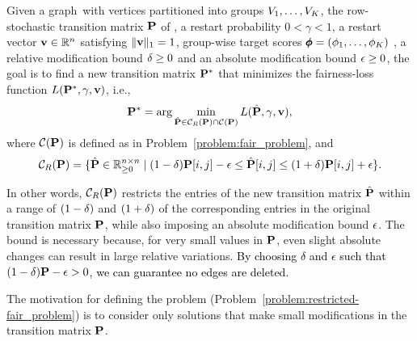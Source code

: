 \documentclass[sigconf, anonymous, review]{acmart}
\begin{document}
\begin{problem}[\resphiPageRank]
\label{problem:restricted-fair_problem}
Given a graph~\graph with vertices partitioned into groups $V_1, \ldots, V_K$, the row-stochastic transition matrix $\mathbf{{P}}$ of \graph, a restart probability $0 < \gamma < 1$, a restart vector $\mathbf{{v}} \in \mathbb{R}^{n}$ satisfying $\|\mathbf{{v}}\|_1 = 1$, group-wise target \pagerank scores $\pmb{\phi} = (\phi_1, \ldots, \phi_K)$ , a relative modification bound $\delta \ge 0$ and an absolute modification bound $\epsilon \ge 0$, the goal is to find a new transition matrix $\mathbf{{P}}^{*}$ that minimizes the fairness-loss function $L(\mathbf{{P}}^{*}, \gamma, \mathbf{{v}})$, i.e.,
\begin{equation}
\mathbf{{P}}^{*} = \arg \min_{\hat{\mathbf{{P}}} \in \mathcal{C}_R(\mathbf{{P}}) \cap \mathcal{C}(\mathbf{{P}})} L(\hat{\mathbf{{P}}}, \gamma, \mathbf{{v}}),
\label{eq:restrict_fair_problem}
\end{equation}
where $\mathcal{C}(\mathbf{{P}})$ is defined as in Problem~\ref{problem:fair_problem}, and
\begin{equation*}
    \mathcal{C}_R(\mathbf{{P}})
    =
    \{ \hat{\mathbf{{P}}} \in \mathbb{R}_{\geq 0}^{n \times n} \mid (1 - \delta) \mathbf{{P}}[i, j] - \epsilon \le \hat{\mathbf{{P}}}[i, j] \le (1 + \delta) \mathbf{{P}}[i, j] + \epsilon\}.
\end{equation*}
\end{problem}

In other words, $\mathcal{C}_R(\mathbf{{P}})$ restricts the entries of the new transition matrix $\hat{\mathbf{{P}}}$ within a range of $(1 - \delta)$ and $(1 + \delta)$ of the corresponding entries in the original transition matrix $\mathbf{{P}}$, while also imposing an absolute modification bound $\epsilon$. The  bound is necessary because, for very small values in $\mathbf{{P}}$, even slight absolute changes can result in large relative variations. 
\textcolor{black}{By choosing $\delta$ and $\epsilon$ such that $(1 - \delta)\mathbf{{P}} - \epsilon >0$, we can guarantee no edges are deleted.}

The motivation for defining the \resphiPageRank problem (Problem~\ref{problem:restricted-fair_problem})
is to consider only solutions that make small modifications in the transition matrix $\mathbf{{P}}$.
\end{document}
